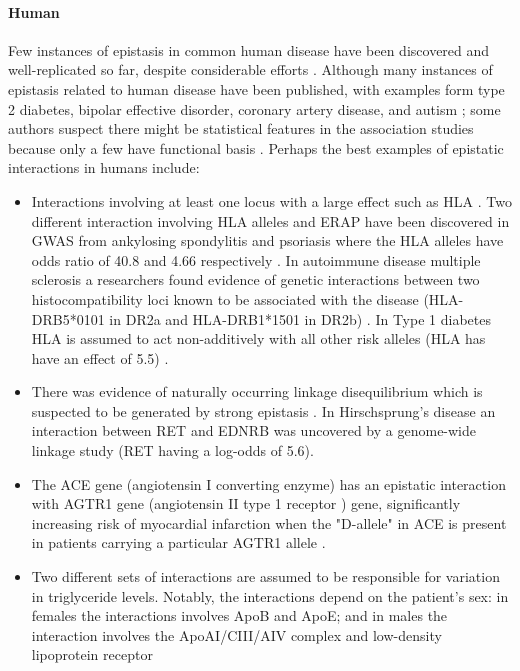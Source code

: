 \paragraph{Human}
Few instances of epistasis in common human disease have been discovered and well-replicated so far, despite considerable efforts \cite{zuk2012mystery}.
Although many instances of epistasis related to human disease have been published, with examples form type 2 diabetes\cite{wiltshire2006epistasis}, bipolar effective disorder\cite{jamra2007first}, coronary artery disease\cite{tsai2007renin}, and autism \cite{coutinho2007evidence}; some authors suspect there might be statistical features in the association studies because only a few have functional basis \cite{phillips2008epistasis}.
Perhaps the best examples of epistatic interactions in humans include:
\begin{itemize}
	\item Interactions involving at least one locus with a large effect such as HLA  \cite{zuk2012mystery}.
Two different interaction involving HLA alleles and ERAP have been discovered in GWAS from ankylosing spondylitis and psoriasis where the HLA alleles have odds ratio of 40.8 and 4.66 respectively \cite{evans2011interaction, genetic2010genome}.
In autoimmune disease multiple sclerosis a researchers found evidence of genetic interactions between two histocompatibility loci known to be associated with the disease (HLA-DRB5*0101 in DR2a and HLA-DRB1*1501 in DR2b) \cite{gregersen2006functional}. 
In Type 1 diabetes HLA is assumed to act non-additively with all other risk alleles (HLA has have an effect of 5.5) \cite{barrett2009genome}.

	\item There was evidence of naturally occurring linkage disequilibrium which is suspected to be generated by strong epistasis \cite{phillips2008epistasis}.
In Hirschsprung's disease an interaction between RET and EDNRB was uncovered by a genome-wide linkage study (RET having a log-odds of 5.6). \cite{carrasquillo2002genome}

	\item The ACE gene (angiotensin I converting enzyme) has an epistatic interaction with AGTR1 gene (angiotensin II type 1 receptor ) gene, significantly increasing risk of myocardial infarction when the "D-allele" in ACE  is present in patients carrying a particular AGTR1 allele \cite{tiret1994synergistic}.

	\item Two different sets of interactions are assumed to be responsible for variation in triglyceride levels.
Notably, the interactions depend on the patient's sex: in females the interactions involves ApoB and ApoE;  and in males the interaction involves the ApoAI/CIII/AIV complex and low-density lipoprotein receptor \cite{nelson2001combinatorial}


\end{itemize}
